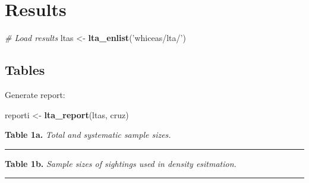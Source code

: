 \documentclass[
]{book}
\newenvironment{Shaded}{\begin{snugshade}}{\end{snugshade}}
\newcommand{\CommentTok}[1]{\textcolor[rgb]{0.56,0.35,0.01}{\textit{#1}}}
\newcommand{\KeywordTok}[1]{\textcolor[rgb]{0.13,0.29,0.53}{\textbf{#1}}}
\newcommand{\NormalTok}[1]{#1}
\newcommand{\OperatorTok}[1]{\textcolor[rgb]{0.81,0.36,0.00}{\textbf{#1}}}
\newcommand{\StringTok}[1]{\textcolor[rgb]{0.31,0.60,0.02}{#1}}
\begin{document}
\hypertarget{results}{%
\section*{Results}\label{results}}

\begin{Shaded}
\begin{Highlighting}[]
\CommentTok{# Load results}
\NormalTok{ltas <-}\StringTok{ }\KeywordTok{lta_enlist}\NormalTok{(}\StringTok{'whiceas/lta/'}\NormalTok{)}
\end{Highlighting}
\end{Shaded}

\hypertarget{tables-1}{%
\subsection*{Tables}\label{tables-1}}

Generate report:

\begin{Shaded}
\begin{Highlighting}[]
\NormalTok{reporti <-}\StringTok{ }\KeywordTok{lta_report}\NormalTok{(ltas, cruz)}
\end{Highlighting}
\end{Shaded}

\textbf{Table 1a.} \emph{Total and systematic sample sizes.}

\begin{Shaded}
\end{Shaded}

\begin{center}\rule{0.5\linewidth}{0.5pt}\end{center}

\textbf{Table 1b.} \emph{Sample sizes of sightings used in density esitmation.}

\begin{Shaded}
\end{Shaded}

\begin{center}\rule{0.5\linewidth}{0.5pt}\end{center}
\end{document}
